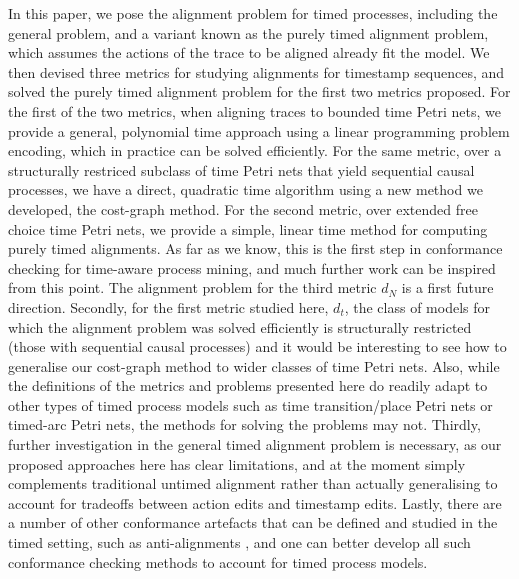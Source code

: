 \documentclass[conference]{IEEEtran}
\begin{document}
		In this paper, we pose the alignment problem for timed processes, including the general problem, and a variant known as the purely timed alignment problem, which assumes the actions of the trace to be aligned already fit the model. 
		We then devised three metrics for studying alignments for timestamp sequences, and solved the purely timed alignment problem for the first two metrics proposed. 
		For the first of the two metrics, when aligning traces to bounded time Petri nets, we provide a general, polynomial time approach using a linear programming problem encoding, which in practice can be solved efficiently. 
		For the same metric, over a structurally restriced subclass of time Petri nets that yield sequential causal processes, we have a direct, quadratic time algorithm using a new method we developed, the cost-graph method. 
		For the second metric, over extended free choice time Petri nets, we provide a simple, linear time method for computing purely timed alignments. 
		As far as we know, this is the first step in conformance checking for time-aware process mining, and much further work can be inspired from this point. 
		The alignment problem for the third metric $d_N$ is a first future direction. 
		Secondly, for the first metric studied here, $d_t$, the class of models for which the alignment problem was solved efficiently is structurally restricted (those with sequential causal processes) and it would be interesting to see how to generalise our cost-graph method to wider classes of time Petri nets. 
		Also, while the definitions of the metrics and problems presented here do readily adapt to other types of timed process models such as time transition/place Petri nets or timed-arc Petri nets, the methods for solving the problems may not.
		Thirdly, further investigation in the general timed alignment problem is necessary, as our proposed approaches here has clear limitations, and at the moment simply complements traditional untimed alignment rather than actually generalising to account for tradeoffs between action edits and timestamp edits. 
		Lastly, there are a number of other conformance artefacts that can be defined and studied in the timed setting, such as anti-alignments \cite{CBC21}, and one can better develop all such conformance checking methods to account for timed process models.
		
		

	

	
	
	
\end{document}
